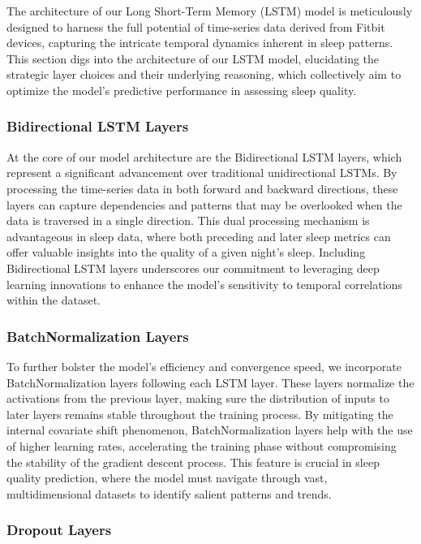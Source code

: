 \documentclass[10pt]{extarticle}
\begin{document}
The architecture of our Long Short-Term Memory (LSTM) model is meticulously designed to harness the full potential of time-series data derived from Fitbit devices, capturing the intricate temporal dynamics inherent in sleep patterns. This section digs into the architecture of our LSTM model, elucidating the strategic layer choices and their underlying reasoning, which collectively aim to optimize the model's predictive performance in assessing sleep quality.

\subsubsection{Bidirectional LSTM Layers}

At the core of our model architecture are the Bidirectional LSTM layers, which represent a significant advancement over traditional unidirectional LSTMs. By processing the time-series data in both forward and backward directions, these layers can capture dependencies and patterns that may be overlooked when the data is traversed in a single direction. This dual processing mechanism is advantageous in sleep data, where both preceding and later sleep metrics can offer valuable insights into the quality of a given night's sleep. Including Bidirectional LSTM layers underscores our commitment to leveraging deep learning innovations to enhance the model's sensitivity to temporal correlations within the dataset.

\subsubsection{BatchNormalization Layers}

To further bolster the model's efficiency and convergence speed, we incorporate BatchNormalization layers following each LSTM layer. These layers normalize the activations from the previous layer, making sure the distribution of inputs to later layers remains stable throughout the training process. By mitigating the internal covariate shift phenomenon, BatchNormalization layers help with the use of higher learning rates, accelerating the training phase without compromising the stability of the gradient descent process. This feature is crucial in sleep quality prediction, where the model must navigate through vast, multidimensional datasets to identify salient patterns and trends.

\subsubsection{Dropout Layers}
\end{document}
